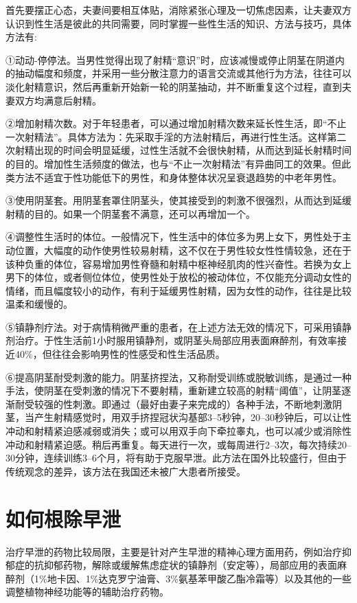 \documentclass[12pt,UTF8]{ctexbook}
\begin{document}
首先要摆正心态，夫妻间要相互体贴，消除紧张心理及一切焦虑因素，让夫妻双方认识到性生活是彼此的共同需要，同时掌握一些性生活的知识、方法与技巧，具体方法有:

①动动-停停法。当男性觉得出现了射精“意识”时，应该减慢或停止阴茎在阴道内的抽动幅度和频度，并采用一些分散注意力的语言交流或其他行为方法，往往可以淡化射精意识，然后再重新开始新一轮的阴茎抽动，并不断重复这个过程，直到夫妻双方均满意后射精。

②增加射精次数。对于年轻患者，可以通过增加射精次数来延长性生活，即“不止一次射精法”。具体方法为：先采取手淫的方法射精后，再进行性生活。这样第二次射精出现的时间会明显延缓，过性生活就不会很快射精，从而达到延长射精时间的目的。增加性生活频度的做法，也与“不止一次射精法”有异曲同工的效果。但此类方法不适宜于性功能低下的男性，和身体整体状况呈衰退趋势的中老年男性。

③使用阴茎套。用阴茎套罩住阴茎头，使其接受到的刺激不很强烈，从而达到延缓射精的目的。如果一个阴茎套不满意，还可以再增加一个。

④调整性生活时的体位。一般情况下，性生活中的体位多为男上女下，男性处于主动位置，大幅度的动作使男性较易射精，这不仅在于男性较女性性情较急，还在于该种负重的体位，容易增加男性脊髓和射精中枢神经肌肉的性兴奋性。若换为女上男下的体位，或者侧位体位，使男性处于放松的被动体位，不仅能充分调动女性的情绪，而且幅度较小的动作，有利于延缓男性射精，因为女性的动作，往往是比较温柔和缓慢的。

⑤镇静剂疗法。对于病情稍微严重的患者，在上述方法无效的情况下，可采用镇静剂治疗。于性生活前1小时服用镇静剂，或阴茎头局部应用表面麻醉剂，有效率接近40\%，但往往会影响男性的性感受和性生活品质。

⑥提高阴茎耐受刺激的能力。阴茎挤捏法，又称耐受训练或脱敏训练，是通过一种手法，使阴茎在受刺激的情况下不要射精，重新建立较高的射精“阈值”，让阴茎逐渐耐受较强的性刺激。即通过（最好由妻子来完成的）各种手法，不断地刺激阴茎，当产生射精感觉时，用双手挤捏冠状沟基部3--5秒钟，20--30秒钟后，可以让性冲动和射精紧迫感减弱或消失；或可以用双手向下牵拉睾丸，也可以减少或消除性冲动和射精紧迫感。稍后再重复。每天进行一次，或每周进行2--3次，每次持续20--30分钟，连续训练3--6个月，将有助于克服早泄。此方法在国外比较盛行，但由于传统观念的差异，该方法在我国还未被广大患者所接受。

\section{如何根除早泄}

治疗早泄的药物比较局限，主要是针对产生早泄的精神心理方面用药，例如治疗抑郁症的抗抑郁药物，解除或缓解焦虑症状的镇静剂（安定等），局部应用的表面麻醉剂（1\%地卡因、1\%达克罗宁油膏、3\%氨基苯甲酸乙酯冷霜等）以及其他的一些调整植物神经功能等的辅助治疗药物。
\end{document}
